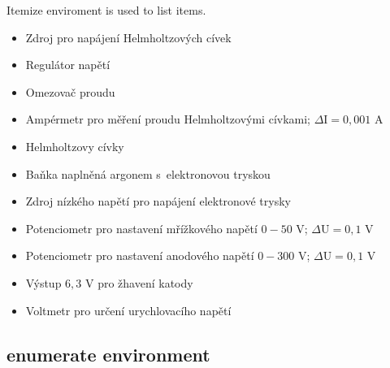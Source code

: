 \documentclass[11pt,a4paper]{report}
\theoremstyle{remark}
\theoremstyle{definition}
\begin{document}
				\noindent
				Itemize enviroment is used to list items.
				\begin{itemize}
					\item Zdroj pro napájení Helmholtzových cívek
					
					\item Regulátor napětí
					
					\item Omezovač proudu
					
					\item Ampérmetr pro měření proudu Helmholtzovými cívkami; $\Delta \text{I} = 0,001$ A
					
					\item Helmholtzovy cívky
					
					\item Baňka naplněná argonem s elektronovou tryskou
					
					\item Zdroj nízkého napětí pro napájení elektronové trysky
					
					\item Potenciometr pro nastavení mřížkového napětí $0-50$ V; $\Delta \text{U} = 0,1$ V %
					
					\item Potenciometr pro nastavení anodového napětí $0-300$ V; $\Delta 
					\text{U} = 0,1$ V
					
					\item Výstup $6,3$ V  pro žhavení katody
					
					\item Voltmetr pro určení urychlovacího napětí
				\end{itemize}
			
			\subsection*{enumerate environment}
			
\end{document}
